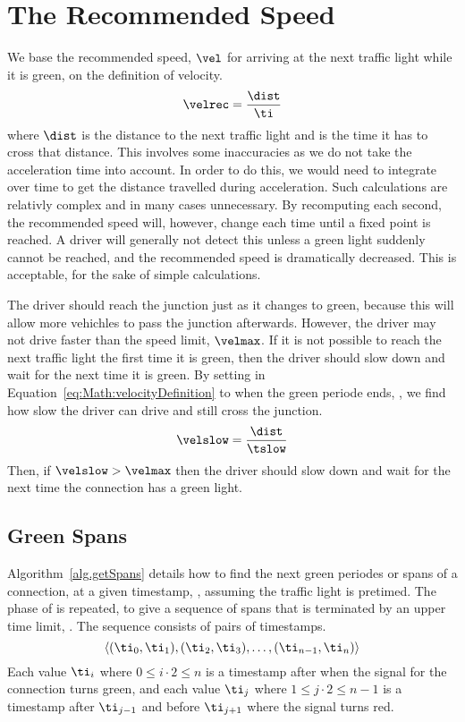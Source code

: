 \section{The Recommended Speed}\label{sec:Math}

We base the recommended speed, $\vel$ for arriving at the next traffic light while it is green, on the definition of velocity.
\begin{eqnarray}
\velrec = \frac{\dist}{\ti}\label{eq:Math:velocityDefinition}
\end{eqnarray}
where $\dist$ is the distance to the next traffic light and \ti is the time it has to cross that distance.
This involves some inaccuracies as we do not take the acceleration time into account. %
In order to do this, we would need to integrate over time to get the distance travelled during acceleration.
Such calculations are relativly complex and in many cases unnecessary. 
By recomputing each second, the recommended speed will, however, change each time until a fixed point is reached. 
A driver will generally not detect this unless a green light suddenly cannot be reached, and the recommended speed is dramatically decreased.
This is acceptable, for the sake of simple calculations.

The driver should reach the junction just as it changes to green, because this will allow more vehichles to pass the junction afterwards.
However, the driver may not drive faster than the speed limit, $\velmax$.
If it is not possible to reach the next traffic light the first time it is green, then the driver should slow down and wait for the next time it is green.
By setting \ti in Equation~\ref{eq:Math:velocityDefinition} to when the green periode ends, \tslow, we find how slow the driver can drive and still cross the junction.
\begin{eqnarray}
\velslow = \frac{\dist}{\tslow}\label{eq:Math:velocitySlow}
\end{eqnarray}
Then, if $\velslow > \velmax$ then the driver should slow down and wait for the next time the connection has a green light.

\subsection{Green Spans}\label{sec:greenSpans}
Algorithm~\ref{alg.getSpans} details how to find the next green periodes or spans of a connection, \con at a given timestamp, \ti, assuming the traffic light is pretimed.
The phase of \con is repeated, to give a sequence of spans that is terminated by an upper time limit, \tmax.
The sequence consists of pairs of timestamps.
\[\langle(\ti_0, \ti_1), (\ti_2, \ti_3), \dots, (\ti_{n-1}, \ti_n)\rangle\]
Each value $\ti_i$ where $0\leq i\cdot 2\leq n$ is a timestamp after \ti when the signal for the connection turns green, and each value $\ti_j$ where $1\leq j\cdot 2\leq n-1$ is a timestamp after $\ti_{j-1}$ and before $\ti_{j+1}$ where the signal turns red.

